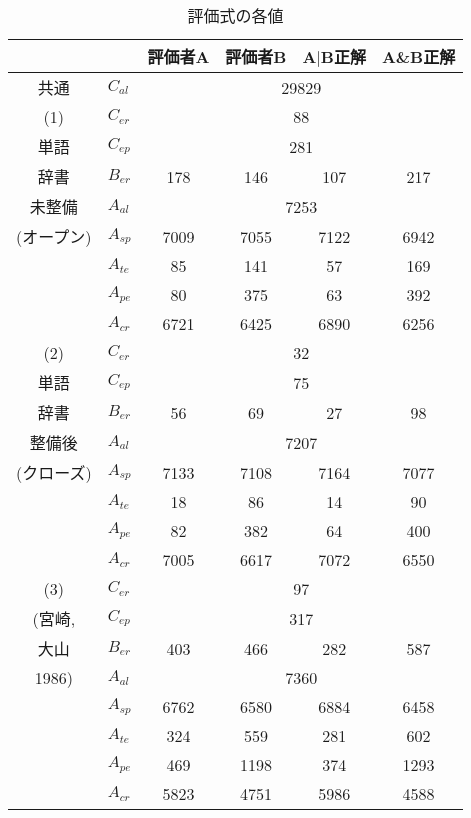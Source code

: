 \begin{table}[tb]
\caption{評価式の各値}
\label{tab:ev_value}
\begin{center}
\begin{tabular}{|c|l|cccc|}\hline
\multicolumn{2}{|l|}{} & 評価者A & 評価者B & A$\mid$B正解 & A\&B正解 \\ \hline
共通 & $C_{al}$ & \multicolumn{4}{|c|}{29829} \\ \hline
(1)	 & $C_{er}$ & \multicolumn{4}{|c|}{88} \\ 
単語	 & $C_{ep}$ & \multicolumn{4}{|c|}{281} \\ 
辞書	 & $B_{er}$ & 178 & 146 & 107 & 217 \\
未整備	 & $A_{al}$ & \multicolumn{4}{|c|}{7253} \\ 
(オープン)	 & $A_{sp}$ &  7009 & 7055 & 7122 & 6942 \\
	 & $A_{te}$ & 85 & 141 & 57 & 169 \\
	 & $A_{pe}$ & 80 & 375 & 63 & 392\\
	 & $A_{cr}$ & 6721 & 6425 & 6890 & 6256 \\ \hline
(2) 	 & $C_{er}$ & \multicolumn{4}{|c|}{32} \\ 
単語	 & $C_{ep}$ & \multicolumn{4}{|c|}{75} \\ 
辞書	 & $B_{er}$ & 56 & 69 & 27 & 98 \\
整備後	 & $A_{al}$ & \multicolumn{4}{|c|}{7207} \\ 
(クローズ)	 & $A_{sp}$ &  7133 & 7108 & 7164 & 7077 \\
	 & $A_{te}$ & 18 & 86 & 14 & 90 \\
	 & $A_{pe}$ & 82 & 382 & 64 &  400\\
	 & $A_{cr}$ & 7005 & 6617 & 7072 & 6550 \\ \hline
(3) 	 & $C_{er}$ & \multicolumn{4}{|c|}{97} \\ 
(宮崎,	 & $C_{ep}$ & \multicolumn{4}{|c|}{317} \\ 
大山	 & $B_{er}$ & 403 & 466 & 282 & 587 \\
1986)	 & $A_{al}$ & \multicolumn{4}{|c|}{7360} \\ 
	 & $A_{sp}$ & 6762 & 6580 & 6884 & 6458 \\
	 & $A_{te}$ & 324 & 559 & 281 & 602 \\
	 & $A_{pe}$ & 469 & 1198 & 374 & 1293\\
	 & $A_{cr}$ & 5823 & 4751 & 5986 & 4588 \\ \hline
\end{tabular}
\end{center}
\end{table}

